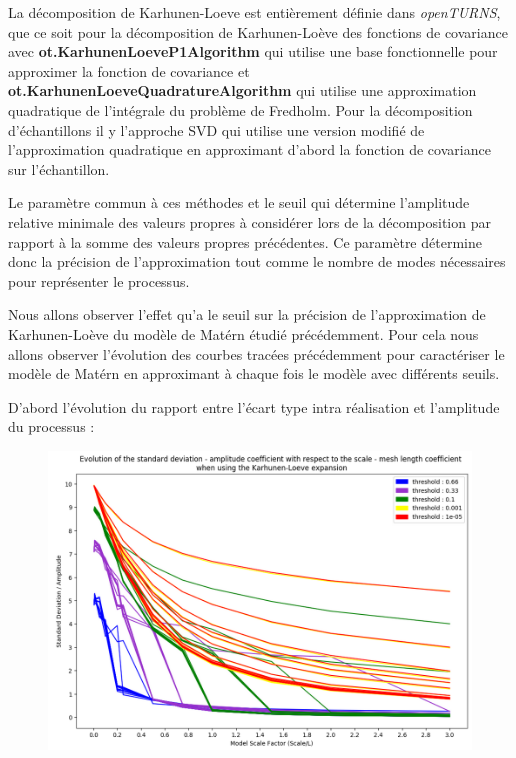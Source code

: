 \documentclass[a4paper,10pt]{article}
\begin{document}
	 La décomposition de Karhunen-Loeve est entièrement définie dans \textit{openTURNS}, que ce soit pour la décomposition de Karhunen-Loève des fonctions de covariance avec \textbf{ot.KarhunenLoeveP1Algorithm} qui utilise une base fonctionnelle pour 	approximer la fonction de covariance et \textbf{ot.KarhunenLoeveQuadratureAlgorithm} qui utilise une approximation quadratique de l'intégrale du problème de Fredholm. Pour la décomposition d'échantillons il y l'approche SVD qui utilise une version modifié de l'approximation quadratique en approximant d'abord la fonction de covariance sur l'échantillon. \par 
	 
	 Le paramètre commun à ces méthodes et le seuil qui détermine l'amplitude relative minimale des valeurs propres à considérer lors de la décomposition par rapport à la somme des valeurs propres précédentes. Ce paramètre détermine donc la précision de l'approximation tout comme le nombre de modes nécessaires pour représenter le processus. \par 
	 
	 Nous allons observer l'effet qu'a le seuil sur la précision de l'approximation de Karhunen-Loève du modèle de Matérn étudié précédemment. Pour cela nous allons observer l'évolution des courbes tracées précédemment pour caractériser le modèle de Matérn en approximant à chaque fois le modèle avec différents seuils. 
	 
	 D'abord l'évolution du rapport entre l'écart type intra réalisation et l'amplitude du processus : 
	 
\begin{figure}[H]
   \centering   
   \noindent \includegraphics[width = \linewidth]{stdDevIntraKL.png}
      \caption{}
         \label{stdDevIntraKL}
\end{figure}
	 
\end{document}
